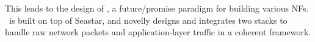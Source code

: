 


This leads to the design of \netstar, a future/promise paradigm for building various NFs. \netstar~is built on top of Seastar, and novelly designs and integrates two stacks to handle raw network packets and application-layer traffic in a coherent framework.



